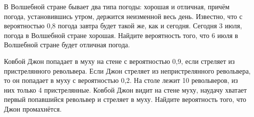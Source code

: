 \begin{listofex}
	\item В Волшебной стране бывает два типа погоды: хорошая и отличная, причём погода, установившись утром, держится неизменной весь день. Известно, что с вероятностью 0,8 погода завтра будет такой же, как и сегодня. Сегодня 3 июля, погода в Волшебной стране хорошая. Найдите вероятность того, что 6 июля в Волшебной стране будет отличная погода.
	\item Ковбой Джон попадает в муху на стене с вероятностью 0,9, если стреляет из пристрелянного револьвера. Если Джон стреляет из непристрелянного револьвера, то он попадает в муху с вероятностью 0,2. На столе лежит 10 револьверов, из них только 4 пристрелянные. Ковбой Джон видит на стене муху, наудачу хватает первый попавшийся револьвер и стреляет в муху. Найдите вероятность того, что Джон промахнётся.
\end{listofex}
%	
\newpage
{}
